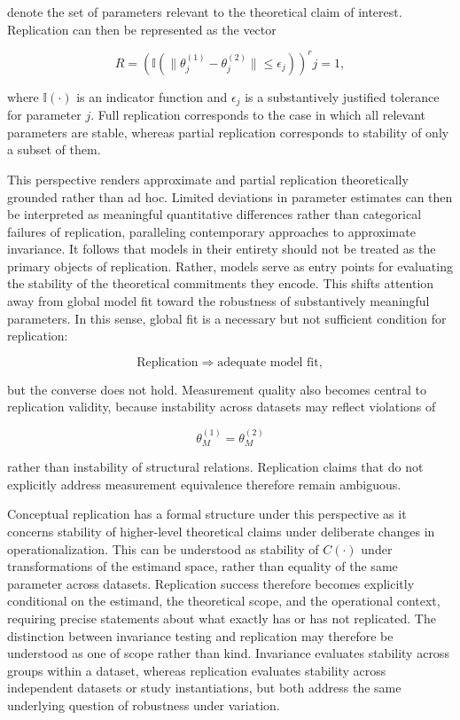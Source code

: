 \documentclass[
  12pt,
  letterpaper,
  man]{apa7}
\begin{document}
denote the set of parameters relevant to the theoretical claim of
interest. Replication can then be represented as the vector

\[ R = \left( \mathbb{I}\left(\|\theta_j^{(1)} - \theta_j^{(2)}\| \le \epsilon_j\right) \right)^r{j=1}, \]

where \(\mathbb{I}(\cdot)\) is an indicator function and \(\epsilon_j\)
is a substantively justified tolerance for parameter \(j\). Full
replication corresponds to the case in which all relevant parameters are
stable, whereas partial replication corresponds to stability of only a
subset of them.

This perspective renders approximate and partial replication
theoretically grounded rather than ad hoc. Limited deviations in
parameter estimates can then be interpreted as meaningful quantitative
differences rather than categorical failures of replication, paralleling
contemporary approaches to approximate invariance. It follows that
models in their entirety should not be treated as the primary objects of
replication. Rather, models serve as entry points for evaluating the
stability of the theoretical commitments they encode. This shifts
attention away from global model fit toward the robustness of
substantively meaningful parameters. In this sense, global fit is a
necessary but not sufficient condition for replication:

\[ \text{Replication} \Rightarrow \text{adequate model fit}, \]

but the converse does not hold. Measurement quality also becomes central
to replication validity, because instability across datasets may reflect
violations of

\[ \theta_M^{(1)} = \theta_M^{(2)} \]

rather than instability of structural relations. Replication claims that
do not explicitly address measurement equivalence therefore remain
ambiguous.

Conceptual replication has a formal structure under this perspective as
it concerns stability of higher-level theoretical claims under
deliberate changes in operationalization. This can be understood as
stability of \(C(\cdot)\) under transformations of the estimand space,
rather than equality of the same parameter across datasets. Replication
success therefore becomes explicitly conditional on the estimand, the
theoretical scope, and the operational context, requiring precise
statements about what exactly has or has not replicated. The distinction
between invariance testing and replication may therefore be understood
as one of scope rather than kind. Invariance evaluates stability across
groups within a dataset, whereas replication evaluates stability across
independent datasets or study instantiations, but both address the same
underlying question of robustness under variation.
\end{document}
